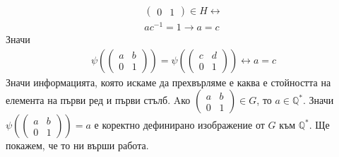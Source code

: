 \documentclass[12pt]{article}
\begin{document}
\begin{enumerate}[label=\alph*)]
\begin{align*}
\begin{pmatrix}
        0 & 1
        \end{pmatrix} \in H \longleftrightarrow \\
        ac^{-1} = 1 \longrightarrow a = c
    \end{align*}
    Значи \begin{align*}
        \psi\left(\begin{pmatrix}
        a & b \\
        0 & 1
        \end{pmatrix}\right) = \psi\left(\begin{pmatrix}
        c & d \\
        0 & 1
        \end{pmatrix}\right) \longleftrightarrow a = c
    \end{align*}
    Значи информацията, която искаме да прехвърляме е каква е стойността на елемента на  първи ред и първи стълб. 
    Aко \(\begin{pmatrix}
        a & b \\
        0 & 1
        \end{pmatrix} \in G\), то \(a \in \mathbb{Q}^*\).
    Значи \(\psi\left(\begin{pmatrix}
        a & b \\
        0 & 1
        \end{pmatrix}\right) = a\) е коректно дефинирано изображение от \(G\) към \(\mathbb{Q}^*\). Ще покажем, че то ни върши работа.
\end{enumerate}
\end{document}
